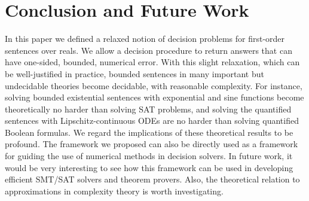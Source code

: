 \documentclass[prodmode]{acmsmall} %
\begin{document}
\section{Conclusion and Future Work}\label{conclude}

In this paper we defined a relaxed notion of decision problems for first-order sentences over reals. We allow a decision procedure to return answers that can have one-sided, bounded, numerical error. With this slight relaxation, which can be well-justified in practice, bounded sentences in many important but undecidable theories become decidable, with reasonable complexity. For instance, solving bounded existential sentences with exponential and sine functions become theoretically no harder than solving SAT problems, and solving the quantified sentences with Lipschitz-continuous ODEs are no harder than solving quantified Boolean formulas. We regard the implications of these theoretical results to be profound. The framework we proposed can also be directly used as a framework for guiding the use of numerical methods in decision solvers. In future work, it would be very interesting to see how this framework can be used in developing efficient SMT/SAT solvers and theorem provers. Also, the theoretical relation to approximations in complexity theory is worth investigating.



\newpage
\end{document}

